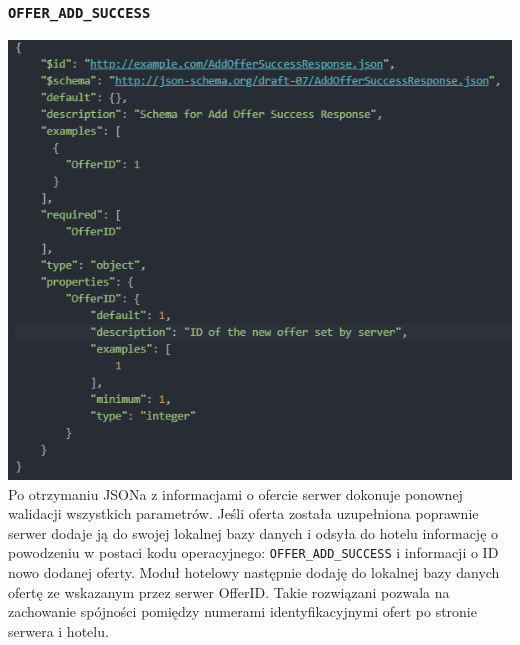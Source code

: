 \documentclass{article}
\begin{document}
\subsubsection{\texttt{OFFER\_ADD\_SUCCESS}}
\includegraphics[width=\linewidth]{Oferta-Hotel-Serwer/Offer_Add_Success.png}
Po otrzymaniu JSONa z informacjami o ofercie serwer dokonuje ponownej walidacji wszystkich parametrów. Jeśli oferta została uzupełniona poprawnie serwer dodaje ją do swojej lokalnej bazy danych i odsyła do hotelu informację o powodzeniu w postaci kodu operacyjnego: \texttt{OFFER\_ADD\_SUCCESS} i informacji o ID nowo dodanej oferty. Moduł hotelowy następnie dodaję do lokalnej bazy danych ofertę ze wskazanym przez serwer OfferID. Takie rozwiązani pozwala na zachowanie spójności pomiędzy numerami identyfikacyjnymi ofert po stronie serwera i hotelu.
\end{document}
